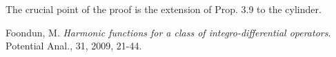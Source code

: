 \documentclass[10pt,a4paper]{article}
\begin{document}
The crucial point of the proof is the
extension of Prop. 3.9   \cite{F} to
the cylinder. %









\bigskip


%
%
%
%
\begin{thebibliography}{xx}
 Foondun, M. \emph{Harmonic functions for a
class of integro-differential
operators}. Potential Anal., 31, 2009,
21-44.

\end{thebibliography}
\end{document}
